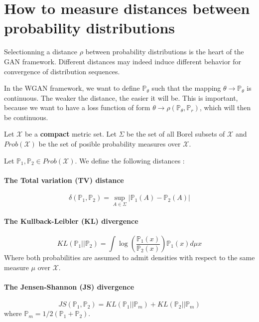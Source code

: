 \documentclass[a4paper]{report}
\newcommand{\X}{\mathcal{X}}
\newcommand{\Prob}{\mathbb{P}}
\theoremstyle{plain}
\theoremstyle{remark}
\theoremstyle{definition}
\begin{document}
\section{How to measure distances between probability distributions}

Selectionning a distance $\rho$ between probability distributions is the heart of the GAN framework. Different distances may indeed induce different behavior for convergence of distribution sequences.

In the WGAN framework, we want to define $\Prob_\theta$ such that the mapping $\theta \rightarrow \Prob_\theta$ is continuous. The weaker the distance, the easier it will be. This is important, because we want to have a loss function of form $\theta \rightarrow \rho(\Prob_\theta, \Prob_r)$, which will then be continuous.

Let $\X$ be a \textbf{compact} metric set. Let $\Sigma$ be the set of all Borel subsets of $\X$ and $Prob(\X)$ be the set of posible probability measures over $\X$.

Let $\Prob_1 , \Prob_2 \in Prob(\X)$. We define the following distances :

\paragraph{The Total variation (TV) distance}
\begin{equation}
\label{eq:TV}
\delta(\Prob_1,\Prob_2) = \sup_{A \in \Sigma} |\Prob_1(A) - \Prob_2(A)|
\end{equation}

\paragraph{The Kullback-Leibler (KL) divergence}
\begin{equation}
\label{eq:KL}
KL(\Prob_1 || \Prob_2) = \int{ \log \left( \frac{\Prob_1(x)}{\Prob_2(x)} \right) \Prob_1(x) d\mu x}
\end{equation}
Where both probabilities are assumed to admit densities with respect to the same measure $\mu$ over $\X$.

\paragraph{The Jensen-Shannon (JS) divergence}
\begin{equation}
\label{eq:JS}
JS(\Prob_1 , \Prob_2) = KL(\Prob_1 || \Prob_m) + KL(\Prob_2 || \Prob_m)
\end{equation}
where $\Prob_m = 1/2 (\Prob_1 + \Prob_2)$.
\end{document}
